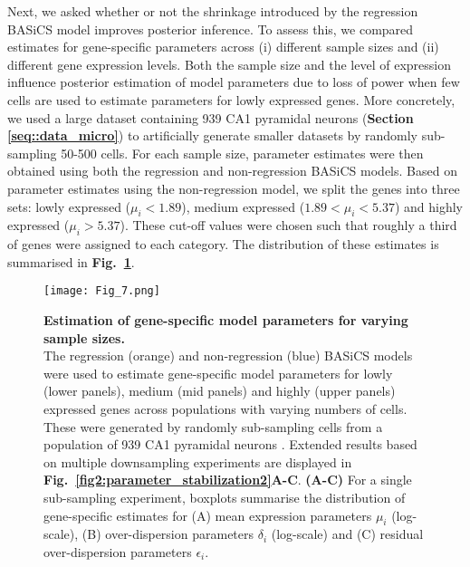 Next, we asked whether or not the shrinkage introduced by the regression BASiCS model improves posterior inference. To assess this, we compared estimates for gene-specific parameters across (i) different sample sizes and (ii) different gene expression levels. Both the sample size and the level of expression influence posterior estimation of model parameters due to loss of power when few cells are used to estimate parameters for lowly expressed genes. More concretely, we used a large dataset containing 939 CA1 pyramidal neurons \citep{Zeisel2015} (\textbf{Section \ref{seq::data_micro}}) to artificially generate smaller datasets by randomly sub-sampling 50-500 cells. For each sample size, parameter estimates were then obtained using both the regression and non-regression BASiCS models. 
Based on parameter estimates using the non-regression model, we split the genes into three sets: lowly expressed ($\mu_i<1.89$), medium expressed ($1.89<\mu_i<5.37$) and highly expressed ($\mu_i>5.37$). These cut-off values were chosen such that roughly a third of genes were assigned to each category. The distribution of these estimates is summarised in \textbf{Fig.~\ref{fig2:parameter_stabilization}}. \\

\begin{figure}[!h]
\centering
\texttt{[image: Fig\_7.png]}
\caption[Estimation of gene-specific model parameters for varying sample sizes]{\textbf{Estimation of gene-specific model parameters for varying sample sizes.}\\
The regression (orange) and non-regression (blue) BASiCS models were used to estimate gene-specific model parameters for lowly (lower panels), medium (mid panels) and highly (upper panels) expressed genes across populations with varying numbers of cells. These were generated by randomly sub-sampling cells from a population of 939 CA1 pyramidal neurons \citep{Zeisel2015}. Extended results based on multiple downsampling experiments are displayed in \textbf{Fig.~\ref{fig2:parameter_stabilization2}A-C}. \textbf{(A-C)} For a single sub-sampling experiment, boxplots summarise the distribution of gene-specific estimates for (A) mean expression parameters $\mu_i$ (log-scale), (B) over-dispersion parameters $\delta_i$ (log-scale) and (C) residual over-dispersion parameters $\epsilon_i$.}
\label{fig2:parameter_stabilization}
\end{figure}

